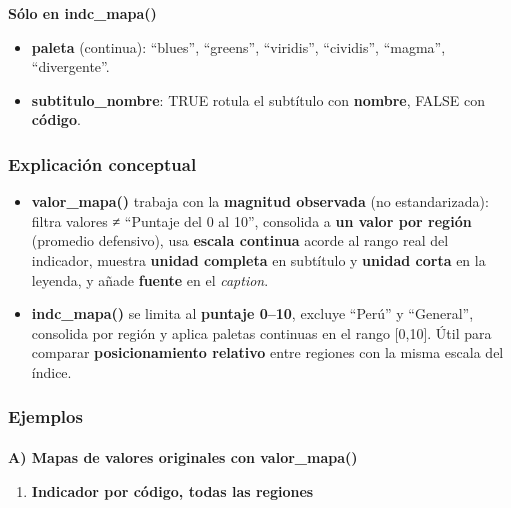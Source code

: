 \documentclass[
  11pt,
  letterpaper,
  DIV=11,
  numbers=noendperiod]{scrartcl}
\makeatletter
\let\oldparagraph\paragraph
\renewcommand{\paragraph}{
    \@ifstar
      \xxxParagraphStar
      \xxxParagraphNoStar
  }
\newcommand{\xxxParagraphStar}[1]{\oldparagraph*{#1}\mbox{}}
\newcommand{\xxxParagraphNoStar}[1]{\oldparagraph{#1}\mbox{}}
\providecommand{\tightlist}{%
  \setlength{\itemsep}{0pt}\setlength{\parskip}{0pt}}\usepackage{longtable,booktabs,array}
\makeatother
\begin{document}
\textbf{Sólo en indc\_mapa()}

\begin{itemize}
\item
  \textbf{paleta} (continua): ``blues'', ``greens'', ``viridis'',
  ``cividis'', ``magma'', ``divergente''.
\item
  \textbf{subtitulo\_nombre}: TRUE rotula el subtítulo con
  \textbf{nombre}, FALSE con \textbf{código}.
\end{itemize}

\subsubsection{\texorpdfstring{\textbf{Explicación
conceptual}}{Explicación conceptual}}\label{explicaciuxf3n-conceptual-13}

\begin{itemize}
\item
  \textbf{valor\_mapa()} trabaja con la \textbf{magnitud observada} (no
  estandarizada): filtra valores ≠ ``Puntaje del 0 al 10'', consolida a
  \textbf{un valor por región} (promedio defensivo), usa \textbf{escala
  continua} acorde al rango real del indicador, muestra \textbf{unidad
  completa} en subtítulo y \textbf{unidad corta} en la leyenda, y añade
  \textbf{fuente} en el \emph{caption}.
\item
  \textbf{indc\_mapa()} se limita al \textbf{puntaje 0--10}, excluye
  ``Perú'' y ``General'', consolida por región y aplica paletas
  continuas en el rango {[}0,10{]}. Útil para comparar
  \textbf{posicionamiento relativo} entre regiones con la misma escala
  del índice.
\end{itemize}

\subsubsection{\texorpdfstring{\textbf{Ejemplos}}{Ejemplos}}\label{ejemplos-13}

\paragraph{\texorpdfstring{\textbf{A) Mapas de valores originales con
valor\_mapa()}}{A) Mapas de valores originales con valor\_mapa()}}\label{a-mapas-de-valores-originales-con-valor_mapa}

\begin{enumerate}
\def\labelenumi{\arabic{enumi}.}
\tightlist
\item
  \textbf{Indicador por código, todas las regiones}
\end{enumerate}
\end{document}

